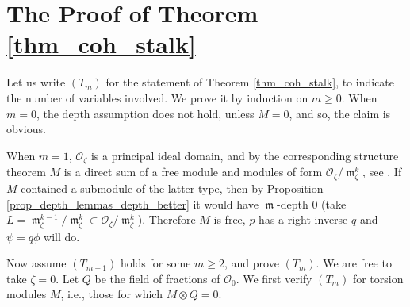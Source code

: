 \documentclass{amsart}
\numberwithin{equation}{section}
\theoremstyle{definition}
\theoremstyle{plain}
\theoremstyle{remark}
\begin{document}
\section{The Proof of Theorem \ref{thm_coh_stalk}}
Let us write $(T_m)$ for the statement of Theorem \ref{thm_coh_stalk},
to indicate the number of variables involved. 
We prove it by induction on $m\geq 0$. 
When $m=0$, the depth assumption does not hold, unless $M=0$, 
and so, the claim
is obvious.

When $m=1$, ${\ensuremath{\mathcal{{O}}}}_\zeta$ is a principal ideal domain, and by the corresponding
structure theorem $M$ is a direct sum of a free module and modules of form 
${\ensuremath{\mathcal{{O}}}}_\zeta/{{\mathop{\mathfrak{m}}}}_\zeta^k$, see \cite[Chapter 12, Theorem 5]{DummitFoote}. If $M$ contained
a submodule of the latter type, then by Proposition 
\ref{prop_depth_lemmas_depth_better} it would have ${{\mathop{\mathfrak{m}}}}$-depth $0$ (take
$L={{\mathop{\mathfrak{m}}}}_\zeta^{k-1}/{{\mathop{\mathfrak{m}}}}_\zeta^k\subset {\ensuremath{\mathcal{{O}}}}_\zeta/{{\mathop{\mathfrak{m}}}}_\zeta^k$).
Therefore $M$ is free, $p$ has a right inverse $q$ and $\psi=q\phi$
will do.

Now assume $(T_{m-1})$ holds for some $m\geq 2$, and prove $(T_m)$.
We
are free to take $\zeta=0$. Let $Q$ be the field of fractions of ${\ensuremath{\mathcal{{O}}}}_0$.
We first verify $(T_m)$ for torsion modules $M$, i.e., those for
which $M\otimes Q=0$.
\end{document}
